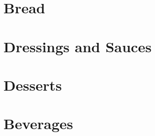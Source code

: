 \documentclass[%
letter,
11pt
]{article}
\begin{document}
\section{Bread}











\section{Dressings and Sauces}





\section{Desserts}












\section{Beverages}








\end{document}
